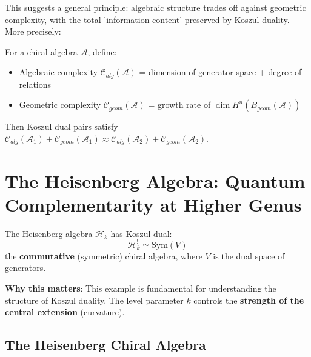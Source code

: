 This suggests a general principle: algebraic structure trades off against geometric complexity, with the total 'information content' preserved by Koszul duality. More precisely:

\begin{conjecture}
For a chiral algebra $\mathcal{A}$, define:
\begin{itemize}
\item Algebraic complexity $\mathcal{C}_{alg}(\mathcal{A})$ = dimension of generator space + degree of relations
\item Geometric complexity $\mathcal{C}_{geom}(\mathcal{A})$ = growth rate of $\dim H^n(\bar{B}_{geom}(\mathcal{A}))$
\end{itemize}
Then Koszul dual pairs satisfy $\mathcal{C}_{alg}(\mathcal{A}_1) + \mathcal{C}_{geom}(\mathcal{A}_1) \approx \mathcal{C}_{alg}(\mathcal{A}_2) + \mathcal{C}_{geom}(\mathcal{A}_2)$.
\end{conjecture}


\section{The Heisenberg Algebra: Quantum Complementarity at Higher Genus}
\label{sec:heisenberg-koszul}




The Heisenberg algebra $\mathcal{H}_k$ has Koszul dual:
$$\mathcal{H}_k^! \simeq \text{Sym}(V)$$
the \textbf{commutative} (symmetric) chiral algebra, where $V$ is the dual space of generators.

\textbf{Why this matters}: This example is fundamental for understanding the structure 
of Koszul duality. The level parameter $k$ controls the \textbf{strength of the central 
extension} (curvature).

\subsection{The Heisenberg Chiral Algebra}

